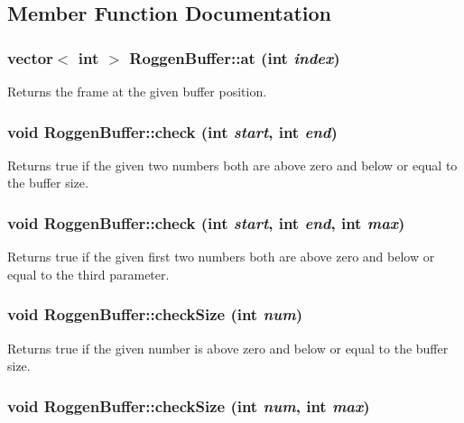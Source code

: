 \subsection{Member Function Documentation}
\hypertarget{classRoggenBuffer_a81e4f32e486a0ae052bbe25088ccaffc}{
\subsubsection[{at}]{\setlength{\rightskip}{0pt plus 5cm}vector$<$ int $>$ RoggenBuffer::at (int {\em index})}}
\label{classRoggenBuffer_a81e4f32e486a0ae052bbe25088ccaffc}
Returns the frame at the given buffer position. \hypertarget{classRoggenBuffer_ad261de53f0e675cc0ed6a704991749c8}{
\subsubsection[{check}]{\setlength{\rightskip}{0pt plus 5cm}void RoggenBuffer::check (int {\em start}, \/  int {\em end})}}
\label{classRoggenBuffer_ad261de53f0e675cc0ed6a704991749c8}
Returns true if the given two numbers both are above zero and below or equal to the buffer size. \hypertarget{classRoggenBuffer_a36077a6513df2178e6454c32b2baa388}{
\subsubsection[{check}]{\setlength{\rightskip}{0pt plus 5cm}void RoggenBuffer::check (int {\em start}, \/  int {\em end}, \/  int {\em max})}}
\label{classRoggenBuffer_a36077a6513df2178e6454c32b2baa388}
Returns true if the given first two numbers both are above zero and below or equal to the third parameter. \hypertarget{classRoggenBuffer_a52b15812bb64d1821cbdce1646eab154}{
\subsubsection[{checkSize}]{\setlength{\rightskip}{0pt plus 5cm}void RoggenBuffer::checkSize (int {\em num})}}
\label{classRoggenBuffer_a52b15812bb64d1821cbdce1646eab154}
Returns true if the given number is above zero and below or equal to the buffer size. \hypertarget{classRoggenBuffer_ab3ed1a78479fcfa51dbb9b4f94cceab0}{
\subsubsection[{checkSize}]{\setlength{\rightskip}{0pt plus 5cm}void RoggenBuffer::checkSize (int {\em num}, \/  int {\em max})}}
